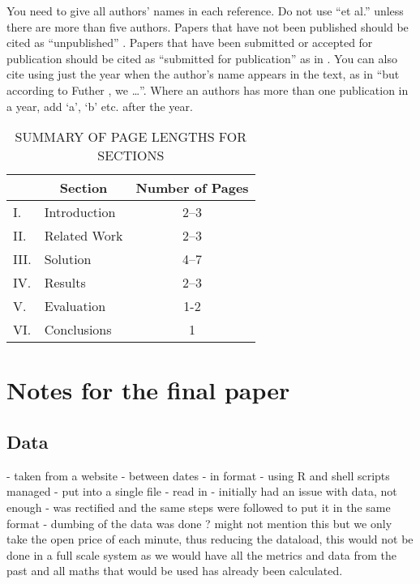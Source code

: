 \documentclass[12pt,a4paper]{article}
\begin{document}
You need to give all authors' names in each reference.  Do not use ``et al.'' unless there are more than five authors.  Papers that have not been published should be cited as ``unpublished'' \cite{euther}.  Papers that have been submitted or accepted for publication should be cited as ``submitted for publication'' as in \cite{futher} .  You can also cite using just the year when the author's name appears in the text, as in ``but according to Futher \citeyear{futher}, we \dots''.  Where an authors has more than one publication in a year, add `a', `b' etc. after the year.

\iffalse
#################################################################################
\fi

\begin{table}[htb]
\centering
\caption{SUMMARY OF PAGE LENGTHS FOR SECTIONS}
\vspace*{6pt}
\label{summary}
\begin{tabular}{|ll|c|} \hline
& \multicolumn{1}{c|}{\bf Section} & {\bf Number of Pages} \\ \hline
I. & Introduction & 2--3 \\ \hline
II. & Related Work & 2--3 \\ \hline
III. & Solution & 4--7 \\ \hline
IV. & Results & 2--3 \\ \hline
V. & Evaluation & 1-2 \\ \hline
VI. & Conclusions & 1 \\ \hline
\end{tabular}
\end{table}

\iffalse
#################################################################################
\fi

\section*{Notes for the final paper}

\subsection*{Data}
- taken from a website
- between dates
- in format
- using R and shell scripts managed
- put into a single file
- read in
- initially had an issue with data, not enough
- was rectified and the same steps were followed to put it in the same format
- dumbing of the data was done ? might not mention this but we only take the open price of each minute, thus reducing the dataload, this would not be done in a full scale system as we would have all the metrics and data from the past and all maths that would be used has already been calculated.
\end{document}
